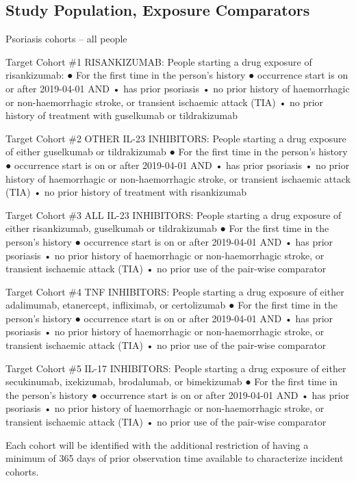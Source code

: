 \documentclass[
  12pt,
]{article}
\begin{document}
\hypertarget{study-population-exposure-comparators}{%
\subsection{Study Population, Exposure Comparators}\label{study-population-exposure-comparators}}

Psoriasis cohorts -- all people

Target Cohort \#1 RISANKIZUMAB: People starting a drug exposure of risankizumab:
● For the first time in the person's history
● occurrence start is on or after 2019-04-01
AND
• has prior psoriasis
• no prior history of haemorrhagic or non-haemorrhagic stroke, or transient ischaemic attack (TIA)
• no prior history of treatment with guselkumab or tildrakizumab

Target Cohort \#2 OTHER IL-23 INHIBITORS: People starting a drug exposure of either guselkumab or tildrakizumab
● For the first time in the person's history
● occurrence start is on or after 2019-04-01
AND
• has prior psoriasis
• no prior history of haemorrhagic or non-haemorrhagic stroke, or transient ischaemic attack (TIA)
• no prior history of treatment with risankizumab

Target Cohort \#3 ALL IL-23 INHIBITORS: People starting a drug exposure of either risankizumab, guselkumab or tildrakizumab
● For the first time in the person's history
● occurrence start is on or after 2019-04-01
AND
• has prior psoriasis
• no prior history of haemorrhagic or non-haemorrhagic stroke, or transient ischaemic attack (TIA)
• no prior use of the pair-wise comparator

Target Cohort \#4 TNF INHIBITORS: People starting a drug exposure of either adalimumab, etanercept, infliximab, or certolizumab
● For the first time in the person's history
● occurrence start is on or after 2019-04-01
AND
• has prior psoriasis
• no prior history of haemorrhagic or non-haemorrhagic stroke, or transient ischaemic attack (TIA)
• no prior use of the pair-wise comparator

Target Cohort \#5 IL-17 INHIBITORS: People starting a drug exposure of either secukinumab, ixekizumab, brodalumab, or bimekizumab
● For the first time in the person's history
● occurrence start is on or after 2019-04-01
AND
• has prior psoriasis
• no prior history of haemorrhagic or non-haemorrhagic stroke, or transient ischaemic attack (TIA)
• no prior use of the pair-wise comparator

Each cohort will be identified with the additional restriction of having a minimum of 365 days of prior observation time available to characterize incident cohorts.
\end{document}
